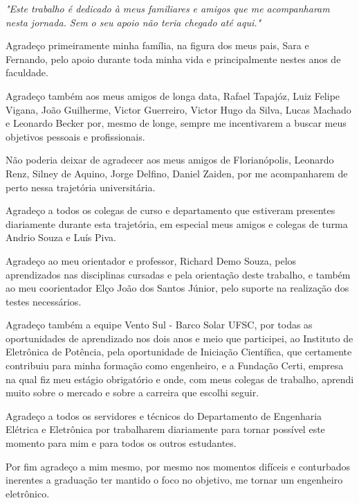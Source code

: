 \documentclass[a5paper]{ufsc-thesis}  %
\begin{document}
\begin{dedicatoria}
   \vspace*{\fill}
	\begin{flushright}
		\textit{"Este trabalho é dedicado à meus familiares e amigos que me acompanharam nesta jornada. Sem o seu apoio não teria chegado até aqui."}
	\end{flushright}
\end{dedicatoria}

\begin{agradecimentos}
Agradeço primeiramente minha família, na figura dos meus pais, Sara e Fernando, pelo apoio durante toda minha vida e principalmente nestes anos de faculdade.

Agradeço também aos meus amigos de longa data, Rafael Tapajóz, Luiz Felipe Vigana, João Guilherme, Victor Guerreiro, Victor Hugo da Silva, Lucas Machado e Leonardo Becker por, mesmo de longe, sempre me incentivarem a buscar meus objetivos pessoais e profissionais.

Não poderia deixar de agradecer aos meus amigos de Florianópolis, Leonardo Renz, Silney de Aquino, Jorge Delfino, Daniel Zaiden, por me acompanharem de perto nessa trajetória universitária.

Agradeço a todos os colegas de curso e departamento que estiveram presentes diariamente durante esta trajetória, em especial meus amigos e colegas de turma Andrio Souza e Luís Piva.

Agradeço ao meu orientador e professor, Richard Demo Souza, pelos aprendizados nas disciplinas cursadas e pela orientação deste trabalho, e também ao meu coorientador Elço João dos Santos Júnior, pelo suporte na realização dos testes necessários.

Agradeço também a equipe Vento Sul - Barco Solar UFSC, por todas as oportunidades de aprendizado nos dois anos e meio que participei, ao Instituto de Eletrônica de Potência, pela oportunidade de Iniciação Científica, que certamente contribuiu para minha formação como engenheiro, e a Fundação Certi, empresa na qual fiz meu estágio obrigatório e onde, com meus colegas de trabalho, aprendi muito sobre o mercado e sobre a carreira que escolhi seguir.

Agradeço a todos os servidores e técnicos do Departamento de Engenharia Elétrica e Eletrônica por trabalharem diariamente para tornar possível este momento para mim e para todos os outros estudantes.

Por fim agradeço a mim mesmo, por mesmo nos momentos difíceis e conturbados inerentes a graduação ter mantido o foco no objetivo, me tornar um engenheiro eletrônico.
\end{agradecimentos}
\end{document}

